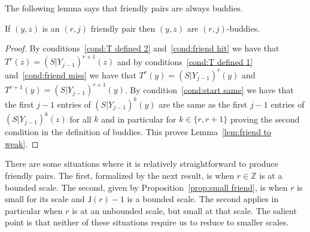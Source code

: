 \documentclass[AHL,Unicode,longabstracts,published]{cedram}
\newcommand{\Z}{\mathbb{Z}}
\newcommand{\scl}{\mathsf{J}}
\begin{document}
The following lemma says that friendly pairs are always buddies.

\begin{lemm}\label{lem:friend to weak}
If $(y,z)$ is an $(r,j)$ friendly pair then $(y,z)$ are $(r,j)$-buddies.
\end{lemm}
\begin{proof}
By conditions~\eqref{cond:T defined 2} and~\eqref{cond:friend hit} we have that $T^r(z)=(S|Y_{j-1})^{r+1}(z)$ and by conditions~\eqref{cond:T defined 1} and~\eqref{cond:friend miss} we have that $T^r(y)=(S|Y_{j-1})^r(y)$ and $T^{r+1}(y)=(S|Y_{j-1})^{r+1}(y)$. By condition~\eqref{cond:start same} we have that the first $j-1$ entries of $(S|Y_{j-1})^k(y)$ are the same as the first $j-1$ entries of $(S|Y_{j-1})^k(z)$ for all $k$ and in particular for $k \in \{r,r+1\}$ proving the second condition in the definition of buddies. This proves Lemma~\ref{lem:friend to weak}.
\end{proof}



There are some situations where it is relatively straightforward to produce friendly pairs. The first, formalized by the next result, is when $r \in \Z$ is at a bounded scale. The second, given by Proposition~\ref{prop:small friend}, is when $r$ is small for its scale and $\scl(r) - 1$ is a bounded scale. The second applies in particular when $r$ is at an unbounded scale, but small at that scale. The salient point is that neither of these situations require us to reduce to smaller scales.
\end{document}
